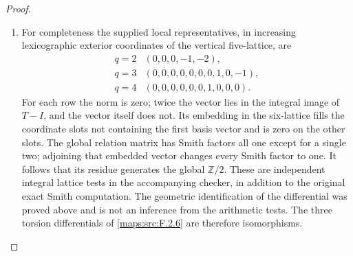 \documentclass[11pt,a4paper]{article}
\theoremstyle{definition}
\begin{document}
\begin{proof}
\begin{enumerate}[label=\arabic*.]
\item For completeness the supplied local representatives, in increasing
lexicographic exterior coordinates of the vertical five-lattice, are
\[
\begin{array}{c|l}
q=2&(0,0,0,-1,-2),\\
q=3&(0,0,0,0,0,0,0,1,0,-1),\\
q=4&(0,0,0,0,0,0,1,0,0,0).
\end{array}
\]
For each row the norm is zero; twice the vector lies in the integral
image of $T-I$, and the vector itself does not. Its embedding in
the six-lattice fills the coordinate slots not containing the first
basis vector and is zero on the other slots. The global relation
matrix has Smith factors all one except for a single two; adjoining
that embedded vector changes every Smith factor to one. It follows
that its residue generates the global $\mathbb Z/2$. These are
independent integral lattice tests in the accompanying checker, in
addition to the original exact Smith computation. The geometric
identification of the differential was proved above and is not an
inference from the arithmetic tests. The three torsion differentials
of \ref{maps:src:F.2.6} are therefore isomorphisms.

\end{enumerate}
\end{proof}
\end{document}
